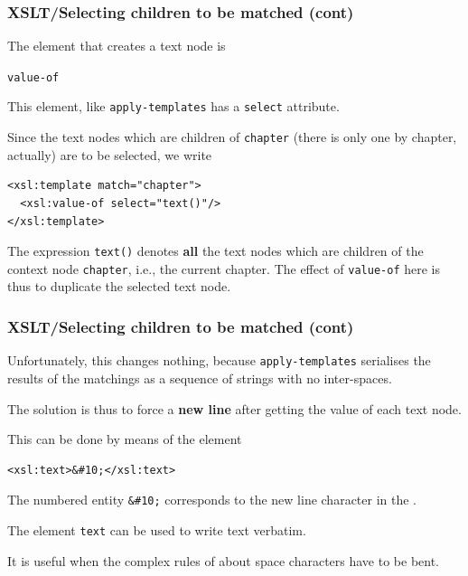 %
\begin{frame}[containsverbatim]
\frametitle{XSLT/Selecting children to be matched (cont)}

The \XSLT element that creates a text node is
\begin{center}
\verb|value-of|
\end{center}
This element, like \texttt{apply-templates} has a \texttt{select}
attribute.

\bigskip

Since the text nodes which are children of \texttt{chapter} (there is
only one by chapter, actually) are to be selected, we write {\small
\begin{verbatim}
<xsl:template match="chapter">
  <xsl:value-of select="text()"/>
</xsl:template>
\end{verbatim}
}
The expression \texttt{text()} denotes \textbf{all} the text nodes
which are children of the context node \texttt{chapter}, i.e., the
current chapter. The effect of \texttt{value-of} here is thus to
duplicate the selected text node.

\end{frame}

%
\begin{frame}[containsverbatim]
\frametitle{XSLT/Selecting children to be matched (cont)}

Unfortunately, this changes nothing, because
\texttt{apply-templates} serialises the results of the
matchings as a sequence of strings with no inter-spaces.

\bigskip

The solution is thus to force a \textbf{new line} after getting the
value of each text node.

\bigskip

This can be done by means of the element
{\small
\begin{verbatim}
<xsl:text>&#10;</xsl:text>
\end{verbatim}
}
The numbered entity \verb|&#10;| corresponds to the new line character
in the \ASCII.

\bigskip

The \XSLT element \texttt{text} can be used to write text verbatim.

\bigskip

It is useful when the complex rules of \XML about space characters
have to be bent.

\end{frame}

